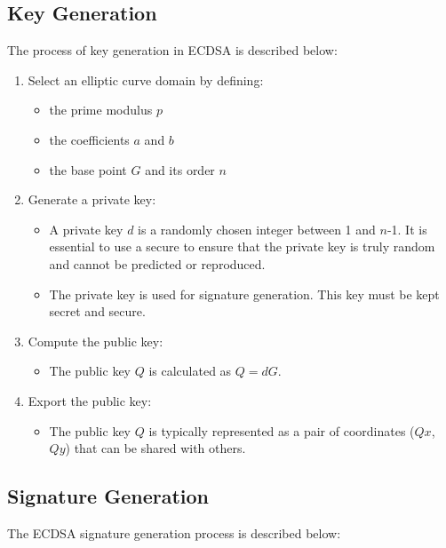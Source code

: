 \documentclass[main\_\_EN.tex]{subfiles}
\begin{document}
\subsection{Key Generation}

The process of key generation in ECDSA is described below:
\begin{enumerate}
    \item Select an elliptic curve domain by defining:
    \begin{itemize}
        \item the prime modulus $p$
        \item the coefficients $a$ and $b$
        \item the base point $G$ and its order $n$
    \end{itemize}
    \item Generate a private key:
    \begin{itemize}
        \item A private key $d$ is a randomly chosen integer between 1 and $n$-1. It is essential to use a secure \textit{} to ensure that the private key is truly random and cannot be predicted or reproduced.
        \item The private key is used for signature generation. This key must be kept secret and secure.
    \end{itemize}
    \item Compute the public key:
    \begin{itemize}
        \item The public key $Q$ is calculated as $Q = dG$.
    \end{itemize}
    \item Export the public key:
    \begin{itemize}
        \item The public key $Q$ is typically represented as a pair of coordinates ($Qx$, $Qy$) that can be shared with others.
    \end{itemize}
\end{enumerate}

\subsection{Signature Generation}

The ECDSA signature generation process is described below:
\end{document}
